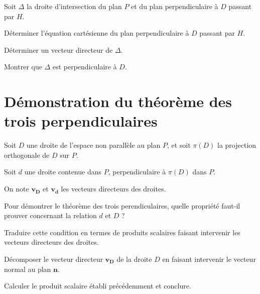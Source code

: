 \documentclass[10pt,a4paper]{article}
\begin{document}
Soit $\Delta$ la droite d'intersection du plan $P$ et du plan perpendiculaire à $D$ passant par
$H$.

\q Déterminer l'équation cartésienne du plan perpendiculaire à $D$ passant par $H$.

\q Déterminer un vecteur directeur de $\Delta$.

\q Montrer que $\Delta$ est perpendiculaire à $D$.


\section{Démonstration du théorème des trois perpendiculaires}

Soit $D$ une droite de l'espace non parallèle au plan $P$, et soit $\pi(D)$ la projection
orthogonale de $D$ sur $P$.

Soit $d$ une droite contenue dans $P$, perpendiculaire à $\pi(D)$ dans $P$.

On note $\mathbf{v_D}$ et $\mathbf{v_d}$ les vecteurs directeurs des droites.

\q Pour démontrer le théorème des trois perendiculaires, quelle propriété faut-il prouver concernant
la relation $d$ et $D$ ?

\q Traduire cette condition en termes de produits scalaires faisant intervenir les vecteurs
directeurs des droites.

\q Décomposer le vecteur directeur $\mathbf{v_D}$ de la droite $D$ en faisant intervenir le vecteur
normal au plan $\mathbf{n}$.

\q Calculer le produit scalaire établi précédemment et conclure.
\end{document}
